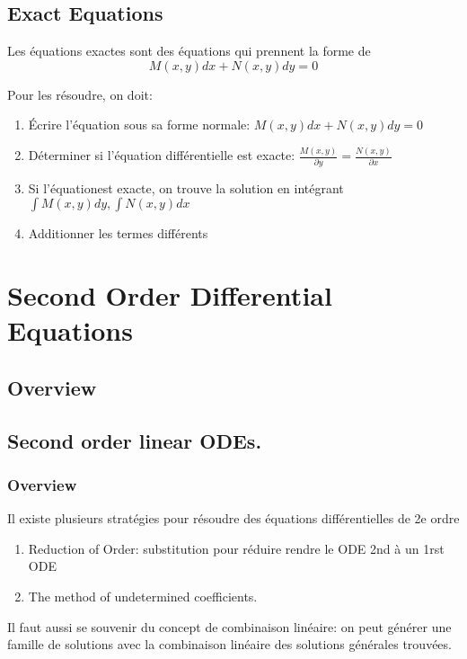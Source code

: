 \documentclass{article}
\begin{document}
\subsection{Exact Equations}

Les équations exactes sont des équations qui prennent la forme de
$$ M(x,y) dx + N(x,y) dy =0$$

Pour les résoudre, on doit:
\begin{enumerate}
    \item Écrire l'équation sous sa forme normale:
	$ M(x,y) dx + N(x,y) dy =0$
    \item Déterminer si l'équation différentielle est exacte:
	$ \frac{M(x,y)}{\partial y} = \frac{N(x,y)}{\partial x} $
    \item Si l'équationest exacte, on trouve la solution en intégrant
	$ \int M(x,y) dy, \int N(x,y) dx$
    \item Additionner les termes différents
\end{enumerate}

\section{Second Order Differential Equations}
\subsection*{Overview}

\subsection{Second order linear ODEs.}

\subsubsection{Overview}%
\label{ssub:Overview}

Il existe plusieurs stratégies pour résoudre des équations différentielles
de 2e ordre
\begin{enumerate}
    \item Reduction of Order: substitution pour réduire rendre le ODE 2nd
	à un 1rst ODE
    \item The method of undetermined coefficients.
\end{enumerate}

Il faut aussi se souvenir du concept de combinaison linéaire: on peut
générer une famille de solutions avec la combinaison linéaire des
solutions générales trouvées.
\end{document}
